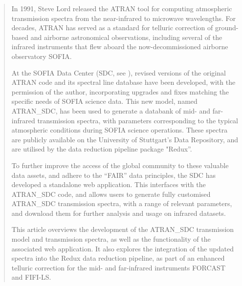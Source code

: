 \documentclass[11pt,twoside]{article}
\begin{document}



\begin{abstract}
In 1991, Steve Lord released the ATRAN tool for computing atmospheric transmission
spectra from the near-infrared to microwave wavelengths. For decades, ATRAN has
served as a standard for telluric correction of ground-based and airborne astronomical
observations, including several of the infrared instruments that flew aboard the
now-decommissioned airborne observatory SOFIA.

At the SOFIA Data Center (SDC, see \citet{P604_adassxxxvi}), revised versions of
the original ATRAN code and its spectral line database have been developed, with
the permission of the author, incorporating upgrades and fixes matching the specific
needs of SOFIA science data. This new model, named ATRAN\_SDC, has been used to
generate a databank of mid- and far-infrared transmission spectra, with parameters
corresponding to the typical atmospheric conditions during SOFIA science operations.
These spectra are publicly available on the University of Stuttgart's Data Repository,
and are utilised by the data reduction pipeline package "Redux''.

To further improve the access of the global community to these valuable data assets,
and adhere to the ``FAIR'' data principles, the SDC has developed a standalone web application.
This interfaces with the ATRAN\_SDC code, and allows users to generate fully customised
ATRAN\_SDC transmission spectra, with a range of relevant parameters, and download them
for further analysis and usage on infrared datasets.

This article overviews the development of the ATRAN\_SDC transmission model and
transmission spectra, as well as the functionality of the associated web application.
It also explores the integration of the updated spectra into the Redux data
reduction pipeline, as part of an enhanced telluric correction for the mid- and
far-infrared instruments FORCAST and FIFI-LS.
\end{abstract}
\end{document}
